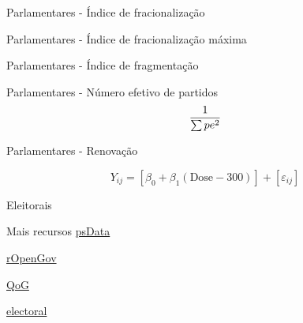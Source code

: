 \documentclass[
  9pt,
  ignorenonframetext,
  aspectratio=169]{beamer}
\begin{document}
\begin{frame}{Parlamentares - Índice de fracionalização}
\protect\hypertarget{parlamentares---uxedndice-de-fracionalizauxe7uxe3o}{}
\end{frame}

\begin{frame}{Parlamentares - Índice de fracionalização máxima}
\protect\hypertarget{parlamentares---uxedndice-de-fracionalizauxe7uxe3o-muxe1xima}{}
\end{frame}

\begin{frame}{Parlamentares - Índice de fragmentação}
\protect\hypertarget{parlamentares---uxedndice-de-fragmentauxe7uxe3o}{}
\end{frame}

\begin{frame}{Parlamentares - Número efetivo de partidos}
\protect\hypertarget{parlamentares---nuxfamero-efetivo-de-partidos}{}
\[ \Huge \frac{1}{\sum pe^{2}} \]
\end{frame}

\begin{frame}{Parlamentares - Renovação}
\protect\hypertarget{parlamentares---renovauxe7uxe3o}{}
\begingroup\Large

\begin{equation*}
Y_{ij} = [\beta_0 + \beta_1 (\text{Dose}-300)] + [\varepsilon_{ij}]
\end{equation*} \endgroup
\end{frame}

\begin{frame}{Eleitorais}
\protect\hypertarget{eleitorais}{}
\end{frame}

\begin{frame}{Mais recursos}
\protect\hypertarget{mais-recursos}{}
\href{https://github.com/rOpenGov/psData}{psData}

\href{http://ropengov.github.io/projects/}{rOpenGov}

\href{http://ropengov.github.io/rqog/}{QoG}

\href{https://cran.r-project.org/web/packages/electoral/index.html}{electoral}
\end{frame}
\end{document}
